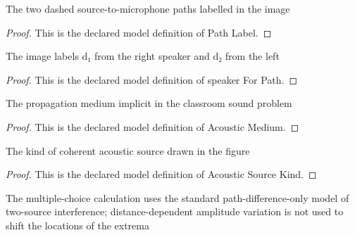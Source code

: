 \begin{definition}
  \label{def:physics:phyx-mini-0219:phyxminiproblems-problemphyxmini0219-pathlabel}
  The two dashed source-to-microphone paths labelled in the image
\end{definition}
\begin{proof}
  This is the declared model definition of Path Label.
\end{proof}
\begin{definition}
  \label{def:physics:phyx-mini-0219:phyxminiproblems-problemphyxmini0219-speakerforpath}
  The image labels d₁ from the right speaker and d₂ from the left
\end{definition}
\begin{proof}
  This is the declared model definition of speaker For Path.
\end{proof}
\begin{definition}
  \label{def:physics:phyx-mini-0219:phyxminiproblems-problemphyxmini0219-acousticmedium}
  The propagation medium implicit in the classroom sound problem
\end{definition}
\begin{proof}
  This is the declared model definition of Acoustic Medium.
\end{proof}
\begin{definition}
  \label{def:physics:phyx-mini-0219:phyxminiproblems-problemphyxmini0219-acousticsourcekind}
  The kind of coherent acoustic source drawn in the figure
\end{definition}
\begin{proof}
  This is the declared model definition of Acoustic Source Kind.
\end{proof}
\begin{definition}
  \label{def:physics:phyx-mini-0219:phyxminiproblems-problemphyxmini0219-interferenceapproximation}
  The multiple-choice calculation uses the standard path-difference-only model of two-source interference; distance-dependent amplitude variation is not used to shift the locations of the extrema
\end{definition}
